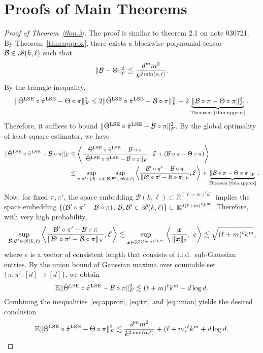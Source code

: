 \documentclass[11pt]{article}
\theoremstyle{definition}
\newcommand*{\KeepStyleUnderBrace}[1]{%
  \mathop{%
    \mathchoice
    {\underbrace{\displaystyle#1}}%
    {\underbrace{\textstyle#1}}%
    {\underbrace{\scriptstyle#1}}%
    {\underbrace{\scriptscriptstyle#1}}%
  }\limits
}
\def\caliB{\mathscr{B}}
\begin{document}
\section{Proofs of Main Theorems}
\begin{proof}[Proof of Theorem~\ref{thm:3}] The proof is similar to theorem 2.1 on note 030721. By Theorem~\ref{thm:approx}, there exists a blockwise polynomial tensor $\tB\in\caliB(k,\ell)$ such that
\begin{equation}\label{eq:approx}
\lVert\mathcal{B}-\Theta\rVert_F^2\lesssim {d^mm^2\over k^{2\min(\alpha,\ell)}}.
\end{equation}
By the triangle inequality,
\begin{equation}\label{eq:tri}
\FnormSize{}{\hat\Theta^\textup{LSE}\circ\hat\pi^\textup{LSE} -\Theta\circ \pi}^2\leq 2\FnormSize{}{\hat\Theta^\textup{LSE}\circ\hat\pi^\textup{LSE} -\tB\circ \pi}^2+2\KeepStyleUnderBrace{\FnormSize{}{\tB\circ \pi-\Theta\circ \pi}^2}_{\textup{Theorem~\ref{thm:approx}}}.
\end{equation}
Therefore, it suffices to bound $\lVert\hat\Theta^\textup{LSE}\circ\hat\pi^\textup{LSE} -\mathcal{B}\circ \pi\rVert_F^2$. By the global optimality of least-square estimator, we have
\begin{align}
\FnormSize{}{\hat\Theta^\textup{LSE}\circ\hat\pi^\textup{LSE} -\tB\circ \pi}&\leq \left\langle {\hat \Theta^\textup{LSE}\circ \hat \pi^\textup{LSE}-\tB\circ \pi \over \FnormSize{}{ \hat \Theta^\textup{LSE}\circ \hat \pi^\textup{LSE}-\tB\circ \pi}},\ \tE+(\tB\circ \pi-\Theta\circ \pi) \right \rangle \\
&\leq \sup_{\pi, \pi'\colon[d]\to[d]}\sup_{\tB, \tB'\in \caliB(k,\ell)} \left\langle {\tB'\circ \pi'-\tB\circ \pi \over \FnormSize{}{\tB'\circ \pi'-\tB\circ \pi}}, \tE \right \rangle+\KeepStyleUnderBrace{\FnormSize{}{\tB\circ \pi-\Theta\circ \pi}}_{\textup{Theorem~\ref{thm:approx}}}.
\end{align}
Now, for fixed $\pi,\pi'$, the space embedding $\caliB(k,\ell)\subset \mathbb{R}^{(\ell+m)^\ell k^m}$ implies the space embedding $\{(\tB'\circ \pi'-\tB\circ \pi)\colon \tB, \tB'\in\caliB(k,\ell)\} \subset\mathbb{R}^{2(\ell+m)^\ell k^m}$. Therefore, with very high probability, 
\[
\sup_{\tB, \tB'\in \caliB(k,\ell)} \left\langle {\tB'\circ \pi'-\tB\circ \pi \over \FnormSize{}{\tB'\circ \pi'-\tB\circ \pi}}, \tE \right \rangle \lesssim \sup_{\mx\in \mathbb{R}^{2(\ell+m)^\ell k^m} }\left\langle {\mx\over \vnormSize{}{\mx}},\ e \right\rangle \lesssim \sqrt{(\ell+m)^\ell k^m},
\]
where $e$ is a vector of consistent length that consists of i.i.d.\ sub-Gaussian entries. By the union bound of Gaussian maxima over countable set $\{\pi,\pi'\colon [d]\to[d]\}$, we obtain
\begin{equation}\label{eq:union}
\mathbb{E}\lVert\hat\Theta^\textup{LSE}\circ\hat\pi^\textup{LSE} -\mathcal{B}\circ \pi\rVert_F^2\lesssim (\ell+m)^\ell k^m+d\log d.
\end{equation}
Combining the inequalities~\eqref{eq:approx}, \eqref{eq:tri} and \eqref{eq:union} yields the desired conclusion
\[
\mathbb{E}\lVert\hat\Theta^\textup{LSE}\circ\hat\pi^\textup{LSE} -\Theta\circ \pi\rVert_F^2\lesssim  {d^m m^2\over k^{2\min(\alpha, \ell)}}+(\ell+m)^\ell k^m+d\log d.
\]
\end{proof}
\end{document}
